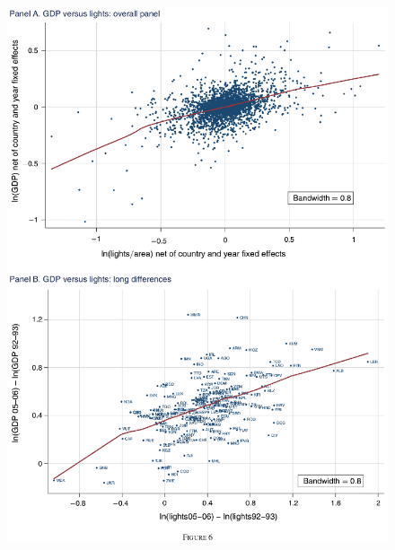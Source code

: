 \documentclass{beamer}
\begin{document}
\begin{frame}
  \begin{figure}
    \includegraphics[scale=.45]{henderson_et_al2.eps}
  \end{figure}
\end{frame}
\end{document}
